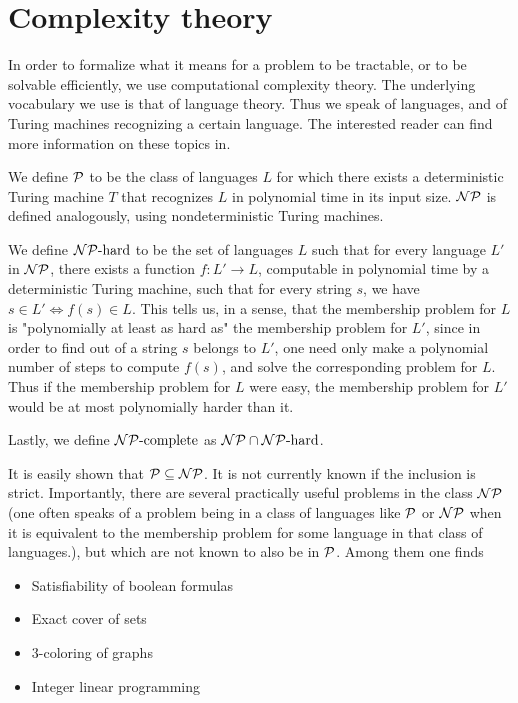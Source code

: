 \chapter{Complexity theory}

In order to formalize what it means for a problem to be tractable, or to be solvable efficiently, we use computational complexity theory. The underlying vocabulary we use is that of language theory. Thus we speak of languages, and of Turing machines recognizing a certain language. The interested reader can find more information on these topics in\cite{Hopcroft}.

We define $\mathcal{P}$ to be the class of languages $L$ for which there exists a deterministic Turing machine $T$ that recognizes $L$ in polynomial time in its input size. $\mathcal{NP}$ is defined analogously, using nondeterministic Turing machines.

We define $\mathcal{NP}{\text{-hard}}$ to be the set of languages $L$ such that for every language $L'$ in $\mathcal{NP}$, there exists a function $f:L' \to L$, computable in polynomial time by a deterministic Turing machine, such that for every string $s$, we have $s \in L' \iff f(s) \in L$. This tells us, in a sense, that the membership problem for $L$ is "polynomially at least as hard as" the membership problem for $L'$, since in order to find out of a string $s$ belongs to $L'$, one need only make a polynomial number of steps to compute $f(s)$, and solve the corresponding problem for $L$. Thus if the membership problem for $L$ were easy, the membership problem for $L'$ would be at most polynomially harder than it.

Lastly, we define $\mathcal{NP}{\text{-complete}}$ as $\mathcal{NP} \cap \mathcal{NP}{\text{-hard}}$.

It is easily shown that $\mathcal{P} \subseteq \mathcal{NP}$. It is not currently known if the inclusion is strict. Importantly, there are several practically useful problems in the class $\mathcal{NP}$ (one often speaks of a problem being in a class of languages like $\mathcal{P}$ or $\mathcal{NP}$ when it is equivalent to the membership problem for some language in that class of languages.), but which are not known to also be in $\mathcal{P}$. Among them one finds

\begin{itemize}
\item Satisfiability of boolean formulas
\item Exact cover of sets
\item 3-coloring of graphs
\item Integer linear programming
\end{itemize}

